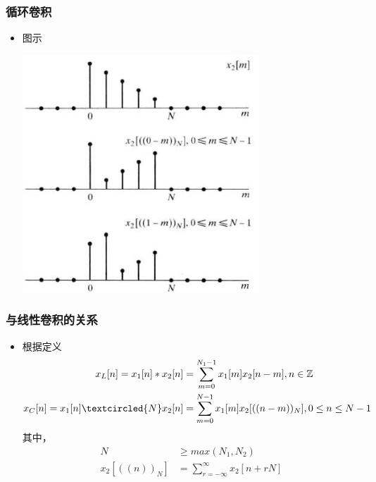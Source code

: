 \documentclass[CJKutf8,xcolor=pdftex,dvipsnames,table]{beamer}
\begin{document}
\begin{CJK*}{UTF8}{song}
\begin{frame}
\begin{itemize}
	\end{itemize}
  \end{frame}  
        
  \begin{frame}
    \frametitle{循环卷积}
    \begin{itemize}
    \item 图示
   		\begin{center}
   		\includegraphics[scale=.6]{dtsp-c-f8-14acd}
   		\end{center}    
	\end{itemize}
  \end{frame} 

  \begin{frame}
    \frametitle{与线性卷积的关系}
    \begin{itemize}
    \item 根据定义
    \begin{align*}
	    x_L[n] = x_1[n] \ast x_2[n] & = \sum_{m=0}^{N_1-1}x_1[m]x_2[n-m], n \in \mathbb{Z}    \\ 	
	    x_C[n] = x_1[n] \textcircled{N} x_2[n] & = \sum_{m=0}^{N-1}x_1[m]x_2[((n-m))_N], 0 \leq n \leq N-1 	    
    \end{align*}
    其中，
    \begin{align*}
	    N & \geq max(N_1, N_2) \\
	    x_2[((n))_N] & = \sum_{r=-\infty}^{\infty} x_2[n+rN]
	\end{align*}
	\end{itemize}
  \end{frame} 
  

\end{CJK*}
\end{document}
